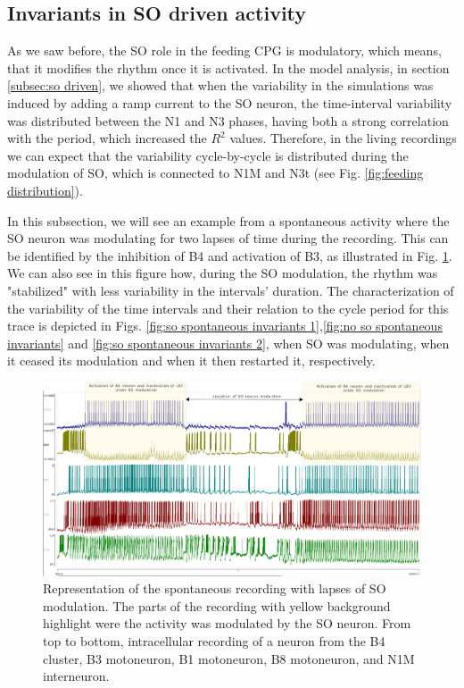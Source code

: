 \clearpage
\newpage
\subsection{Invariants in SO driven activity}
As we saw before, the SO role in the feeding CPG is modulatory, which means, that it modifies the rhythm once it is activated. In the model analysis, in section \ref{subsec:so driven}, we showed that when the variability in the simulations was induced by adding a ramp current to the SO neuron, the time-interval variability was distributed between the N1 and N3 phases, having both a strong correlation with the period, which increased the $R^2$ values. Therefore, in the living recordings we can expect that the variability cycle-by-cycle is distributed during the modulation of SO, which is connected to N1M and N3t (see Fig. \ref{fig:feeding distribution}). 

In this subsection, we will see an example from a spontaneous activity where the SO neuron was modulating for two lapses of time during the recording. This can be identified by the inhibition of B4 and activation of B3, as illustrated in Fig. \ref{fig:SO-spontaneous-driven}. We can also see in this figure how, during the SO modulation, the rhythm was "stabilized" with less variability in the intervals' duration. The characterization of the variability of the time intervals and their relation to the cycle period for this trace is depicted in Figs. \ref{fig:so spontaneous invariants 1},\ref{fig:no so spontaneous invariants} and \ref{fig:so spontaneous invariants 2}, when SO was modulating, when it ceased its modulation and when it then restarted it, respectively. 


 \begin{figure}[htbp]
 	\centering
 	\includegraphics[width=\textwidth]{./img/invariants/SO-spontaneuous-driven.pdf}
 	\caption{Representation of the spontaneous recording with lapses of SO modulation. The parts of the recording with yellow background highlight were the activity was modulated by the SO neuron. From top to bottom, intracellular recording of a neuron from the B4 cluster, B3 motoneuron, B1 motoneuron, B8 motoneuron, and N1M interneuron.}
 	\label{fig:SO-spontaneous-driven}
 \end{figure}

